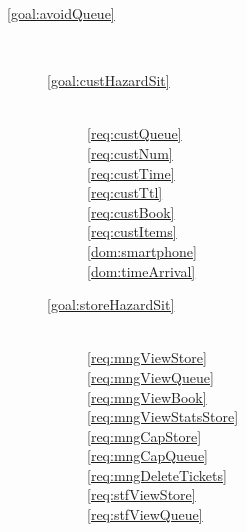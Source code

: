     \begin{description}
        \item[\ref{goal:avoidQueue}]  ~\\

        \begin{description}
            \item[\ref{goal:custHazardSit}]  ~\\

            \ref{req:custQueue}  ~\\
            \ref{req:custNum}  ~\\
            \ref{req:custTime}  ~\\
            \ref{req:custTtl}  ~\\
            \ref{req:custBook}  ~\\
            \ref{req:custItems}  ~\\

            \ref{dom:smartphone}  ~\\
            \ref{dom:timeArrival}  ~\\


            \item[\ref{goal:storeHazardSit}]  ~\\

            \ref{req:mngViewStore}  ~\\
            \ref{req:mngViewQueue}  ~\\
            \ref{req:mngViewBook}  ~\\
            \ref{req:mngViewStatsStore}  ~\\
            \ref{req:mngCapStore}  ~\\
            \ref{req:mngCapQueue}  ~\\
            \ref{req:mngDeleteTickets}  ~\\
            \ref{req:stfViewStore}  ~\\
            \ref{req:stfViewQueue}  ~\\



\end{description}
\end{description}
